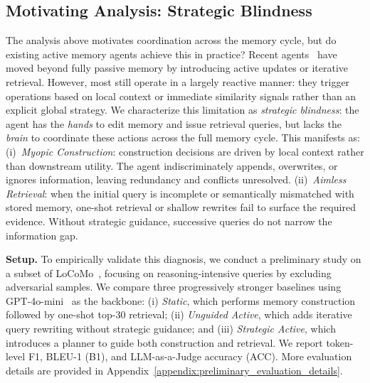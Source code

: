 \subsection{Motivating Analysis: Strategic Blindness}
\label{ssec:motivate_study}
The analysis above motivates coordination across the memory cycle, 
but do existing active memory agents achieve this in practice?
Recent agents~\cite{fang2025lightmem,xu2025mem} have moved beyond 
fully passive memory by introducing active updates or iterative 
retrieval. However, most still operate in a largely reactive 
manner: they trigger operations based on local context or immediate similarity signals rather than an explicit global strategy. 
We characterize this limitation as \emph{strategic blindness}: the agent has the \emph{hands} to edit memory and issue retrieval queries, but lacks the \emph{brain} to coordinate these actions across the full memory cycle.
This manifests as:
(i)~\emph{Myopic Construction}: construction decisions are driven 
by local context rather than downstream utility. The agent 
indiscriminately appends, overwrites, or ignores information, 
leaving redundancy and conflicts unresolved.
(ii)~\emph{Aimless Retrieval}: when the initial query is incomplete 
or semantically mismatched with stored memory, one-shot retrieval 
or shallow rewrites fail to surface the required evidence. Without 
strategic guidance, successive queries do not narrow the information gap.

\noindent\textbf{Setup.} 
To empirically validate this diagnosis, we conduct a preliminary study on a subset of LoCoMo~\cite{maharana2024evaluating}, focusing on reasoning-intensive queries by excluding adversarial samples.
We compare three progressively stronger baselines using GPT-4o-mini~\cite{gpt4ocard} as the backbone:
(i) \textit{Static}, which performs memory construction followed by one-shot top-$30$ retrieval;
(ii) \textit{Unguided Active}, which adds iterative query rewriting without strategic guidance; and
(iii) \textit{Strategic Active}, which introduces a planner to guide both construction and retrieval.
We report token-level F1, BLEU-1 (B1), and LLM-as-a-Judge accuracy (ACC).
More evaluation details are provided in Appendix~\ref{appendix:preliminary_evaluation_details}.


